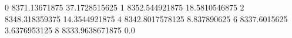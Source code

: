 0 8371.13671875 37.1728515625
1 8352.544921875 18.5810546875
2 8348.318359375 14.3544921875
4 8342.8017578125 8.837890625
6 8337.6015625 3.6376953125
8 8333.9638671875 0.0
